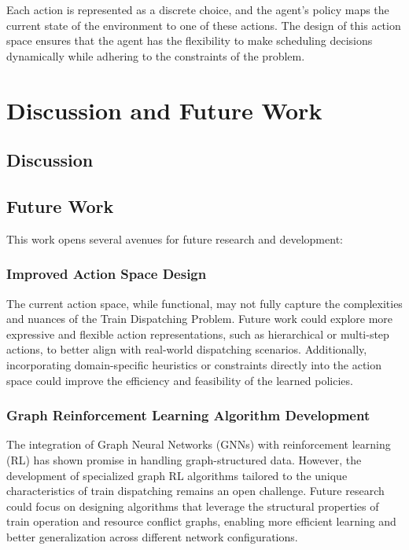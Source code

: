 \documentclass[runningheads]{llncs}
\begin{document}
Each action is represented as a discrete choice, and the agent's policy maps the current state of the environment to one of these actions. The design of this action space ensures that the agent has the flexibility to make scheduling decisions dynamically while adhering to the constraints of the problem.




\section{Discussion and Future Work}
\label{sse:discussion}

\subsection{Discussion}
\label{sss:discussion}

\subsection{Future Work}
\label{sss:future_work}
This work opens several avenues for future research and development:

\subsubsection{Improved Action Space Design}
The current action space, while functional, may not fully capture the complexities and nuances of the Train Dispatching Problem. 
Future work could explore more expressive and flexible action representations, such as hierarchical or multi-step actions, to better align with real-world dispatching scenarios. 
Additionally, incorporating domain-specific heuristics or constraints directly into the action space could improve the efficiency and feasibility of the learned policies.

\subsubsection{Graph Reinforcement Learning Algorithm Development}
The integration of Graph Neural Networks (GNNs) with reinforcement learning (RL) has shown promise in handling graph-structured data. 
However, the development of specialized graph RL algorithms tailored to the unique characteristics of train dispatching remains an open challenge. 
Future research could focus on designing algorithms that leverage the structural properties of train operation and resource conflict graphs, enabling more efficient learning and better generalization across different network configurations.
\end{document}
